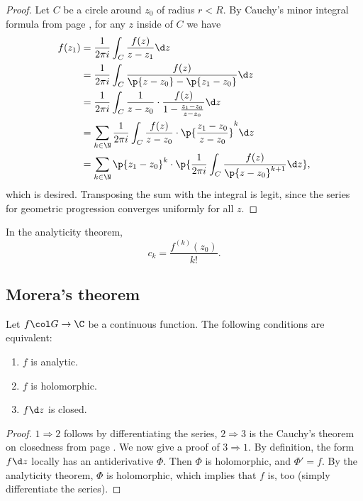 \documentclass[a4paper, 12pt]{article}
\begin{document}
\begin{proof}
  Let $C$ be a circle around $z_0$ of radius $r < R$.
  By Cauchy's minor integral formula from page \pageref{Cauchy, minor integral formula}, for any $z$ inside of $C$ we have
  \begin{align*}
    f(z_1)
    &= \frac{1}{2\pi i} \int_C \frac{f(z)}{z-z_1} \d z \\
    &= \frac{1}{2\pi i} \int_C \frac{f(z)}{\p{z-z_0}-\p{z_1-z_0}} \d z \\
    &= \frac{1}{2\pi i} \int_C \frac{1}{z-z_0} \cdot \frac{f(z)}{1-\frac{z_1-z_0}{z-z_0}} \d z \\
    &= \sum_{k\in \N} \frac{1}{2\pi i} \int_C \frac{f(z)}{z-z_0} \cdot \p{\frac{z_1-z_0}{z-z_0}}^k \d z \\
    &= \sum_{k\in \N} \p{z_1-z_0}^k \cdot \p{ \frac{1}{2\pi i} \int_C \frac{f(z)}{\p{z-z_0}^{k+1}} \d z },
  \end{align*}
  which is desired.
  Transposing the sum with the integral is legit, since the series for geometric progression converges uniformly for all $z$.
\end{proof}

\begin{remark}
  In the analyticity theorem,
  $$ c_k = \frac{f^{(k)}(z_0)}{k!}. $$
\end{remark}

\subsection{Morera's theorem}

\begin{corollary}
  Let $f \col G \to \C$ be a continuous function.
  The following conditions are equivalent:
  \begin{enumerate}
    \item $f$ is analytic.
    \item $f$ is holomorphic.
    \item $f \d z$ is closed. 
  \end{enumerate}
\end{corollary}


\begin{proof}
  $1 \Rightarrow 2$ follows by differentiating the series, $2 \Rightarrow 3$ is the Cauchy's theorem on closedness from page \pageref{Cauchy, on closedness}. We now give a proof of $3 \Rightarrow 1$. By definition, the form $f \d z$ locally has an antiderivative $\Phi$. Then $\Phi$ is holomorphic, and $\Phi' = f$. By the analyticity theorem, $\Phi$ is holomorphic, which implies that $f$ is, too (simply differentiate the series). 
\end{proof}
\end{document}
